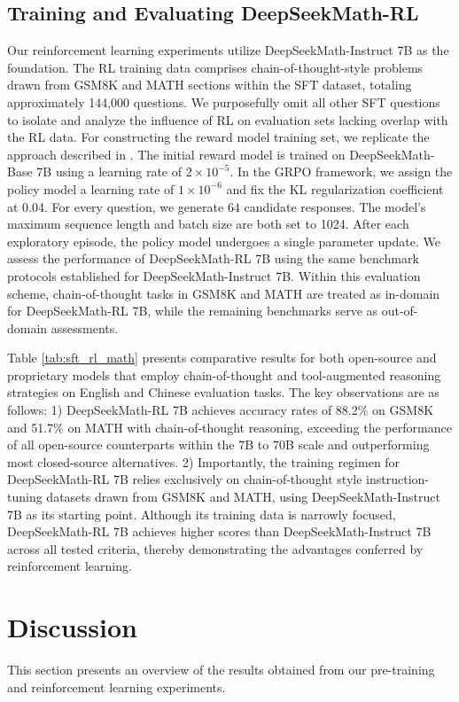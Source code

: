 \begin{itemize}[topsep=0pt]
\begin{itemize}[topsep=0pt]
\subsection{Training and Evaluating DeepSeekMath-RL}

Our reinforcement learning experiments utilize DeepSeekMath-Instruct 7B as the foundation. The RL training data comprises chain-of-thought-style problems drawn from GSM8K and MATH sections within the SFT dataset, totaling approximately 144,000 questions. We purposefully omit all other SFT questions to isolate and analyze the influence of RL on evaluation sets lacking overlap with the RL data. For constructing the reward model training set, we replicate the approach described in \citep{wang2023math}. The initial reward model is trained on DeepSeekMath-Base 7B using a learning rate of $2 \times 10^{-5}$. In the GRPO framework, we assign the policy model a learning rate of $1 \times 10^{-6}$ and fix the KL regularization coefficient at 0.04. For every question, we generate $64$ candidate responses. The model’s maximum sequence length and batch size are both set to 1024. After each exploratory episode, the policy model undergoes a single parameter update. We assess the performance of DeepSeekMath-RL 7B using the same benchmark protocols established for DeepSeekMath-Instruct 7B. Within this evaluation scheme, chain-of-thought tasks in GSM8K and MATH are treated as in-domain for DeepSeekMath-RL 7B, while the remaining benchmarks serve as out-of-domain assessments.

Table \ref{tab:sft_rl_math} presents comparative results for both open-source and proprietary models that employ chain-of-thought and tool-augmented reasoning strategies on English and Chinese evaluation tasks. The key observations are as follows: 1) DeepSeekMath-RL 7B achieves accuracy rates of 88.2\% on GSM8K and 51.7\% on MATH with chain-of-thought reasoning, exceeding the performance of all open-source counterparts within the 7B to 70B scale and outperforming most closed-source alternatives. 2) Importantly, the training regimen for DeepSeekMath-RL 7B relies exclusively on chain-of-thought style instruction-tuning datasets drawn from GSM8K and MATH, using DeepSeekMath-Instruct 7B as its starting point. Although its training data is narrowly focused, DeepSeekMath-RL 7B achieves higher scores than DeepSeekMath-Instruct 7B across all tested criteria, thereby demonstrating the advantages conferred by reinforcement learning.

\section{Discussion}
This section presents an overview of the results obtained from our pre-training and reinforcement learning experiments.


\end{itemize}
\end{itemize}
